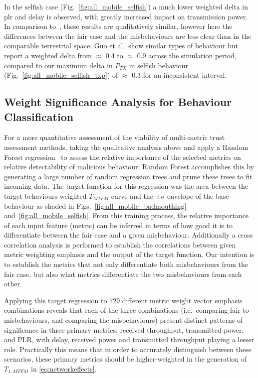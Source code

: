 In the selfish case (Fig.~\ref{fig:all_mobile_selfish}) a much lower weighted delta in \gls{plr} and delay is observed, with greatly increased impact on transmission power.
In comparison to~\cite{Guo11}, these results are qualitatively similar, however here the differences between the fair case and the misbehaviours are less clear than in the comparable terrestrial space.
Guo et al.\ show similar types of behaviour but report a weighted delta from $\approx$ 0.4 to $\approx$ 0.9 across the simulation period, compared to our maximum delta in $P_{TX}$ in selfish behaviour (Fig.~\ref{fig:all_mobile_selfish_txp}) of $\approx$ 0.3 for an inconsistent interval.

\subsection{Weight Significance Analysis for Behaviour Classification}

For a more quantitative assessment of the viability of multi-metric trust assessment methods, taking the qualitative analysis above and apply a Random Forest regression~\cite{Breiman2001} to assess the relative importance of the selected metrics on relative detectability of malicious behaviour. 
Random Forest accomplishes this by generating a large number of random regression trees and prune these trees to fit incoming data.
The target function for this regression was the area between the target behaviours weighted $T_{MTFM}$ curve and the $\pm\sigma$ envelope of the base behaviour as shaded in Figs.~\ref{fig:all_mobile_badmouthing} and~\ref{fig:all_mobile_selfish}.
From this training process, the relative importance of each input feature (metric) can be inferred in terms of how good it is to differentiate between the fair case and a given misbehaviour.
Additionally a cross correlation analysis is performed to establish the correlations between given metric weighting emphasis and the output of the target function.
Our intention is to establish the metrics that not only differentiate both misbehaviours from the fair case, but also what metrics differentiate the two misbehaviours from each other.

Applying this target regression to 729 different metric weight vector emphasis combinations reveals that each of the three combinations (i.e.\ comparing fair to misbehaviours, and comparing the misbehaviours) present distinct patterns of significance in three primary metrics; received throughput, transmitted power, and PLR, with delay, received power and transmitted throughput playing a lesser role.
Practically this means that in order to accurately distinguish between these scenarios, these primary metrics should be higher-weighted in the generation of $T_{1,MTFM}$ in \eqref{eq:networkeffects}.

